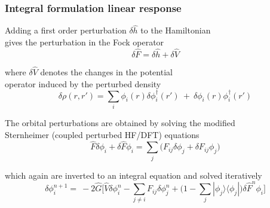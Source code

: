 \begin{frame}
\frametitle{Integral formulation linear response}
\centering
Adding a first order perturbation $\delta\hat{h}$ to the Hamiltonian \\
gives the perturbation in the Fock operator
\begin{equation}
    \nonumber
    \delta\hat{F} = \delta\hat{h} + \delta \hat{V}
\end{equation}


\vspace{6mm}
where $\delta\hat{V}$ denotes the changes in the potential \\
operator induced by the perturbed density
\begin{equation}
    \nonumber
    \delta \rho(r,r') =
    \sum_i \phi_i(r)\delta\phi_i^\dag(r')\ +\ 
    \delta\phi_i(r)\phi_i^\dag(r')
\end{equation}

\pause

\vspace{6mm}
The orbital perturbations are obtained by solving the modified \\
Sternheimer (coupled perturbed HF/DFT) equations
\begin{equation}
    \nonumber
    \hat{F}\delta\phi_i + \delta\hat{F}\phi_i = 
    \sum_j \Big(F_{ij}\delta\phi_j + \delta F_{ij}\phi_j\Big)
\end{equation}

\vspace{6mm}
which again are inverted to an integral equation and solved iteratively
\begin{equation}
    \nonumber
    \delta\phi_i^{n+1} =\ 
    -2\hat{G}\Big[\hat{V} \delta\phi_i^n
    - \sum_{j \neq i} F_{ij}\delta\phi_j^n
    + \Big(1 - \sum_j|\phi_j\rangle\langle\phi_j|\Big) \delta\hat{F}^n\phi_i
    \Big]
\end{equation}
\end{frame}


